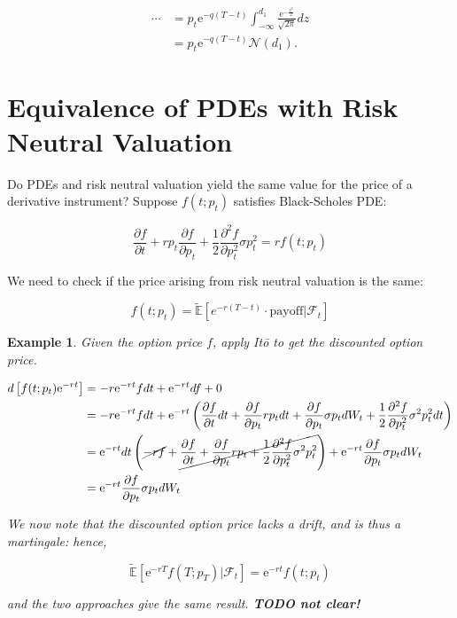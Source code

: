 \documentclass[oneside,titlepage,headinclude,12pt,a4paper,BCOR5mm,footinclude]{book}
\theoremstyle{defn}
\newtheorem{example}{Example}
\newcommand{\eexp}{\mathrm{e}}
\newcommand{\rnE}[1]{\mathbb{\tilde E}\left[ {#1} \right]}
\newcommand\de\partial
\begin{document}
\begin{align*}
  \cdots &= p_t \eexp^{-q(T-t)} \int_{-\infty}^{d_1} \frac{\eexp^{-\frac{z^2}{2}}}{\sqrt{2\pi}} dz
  \\&= p_t \eexp^{-q(T-t)} \mathcal{N}(d_1).
\end{align*}

\section{Equivalence of PDEs with Risk Neutral Valuation}

Do PDEs  and risk  neutral valuation  yield the same  value for  the price  of a
derivative instrument? Suppose $f(t;p_t)$ satisfies Black-Scholes PDE:

\[
  \frac{\de f}{\de t} + rp_t\frac{\de f}{\de p_t} + \frac{1}{2} \frac{\de^2 f}{\de p_t^2}\sigma p_t^2 = rf(t;p_t)
\]

We need to check if the price arising from risk neutral valuation is the same:

\[
  f(t;p_t) = \rnE{e^{-r(T-t)} \cdot \text{payoff} | \mathcal{F}_t}
\]

\begin{example} Given the option price $f$, apply It\=o to get the discounted option price.

\begin{align*}
  d\left[ f(t;p_t) \eexp^{-rt}\right] &= -r\eexp^{-rt} fdt + \eexp^{-rt} df + 0
  \\&= -r\eexp^{-rt} fdt + \eexp^{-rt} \left( \frac{\de f}{\de t} dt + \frac{\de f}{\de p_t} rp_tdt+ \frac{\de f}{\de p_t} \sigma p_t dW_t + 
       \frac{1}{2}\frac{\de^2 f}{\de p_t^2} \sigma^2p_t^2dt \right)
  \\&= \eexp^{-rt}dt \left( \cancel{-rf} + \cancel{\frac{\de f}{\de t} + \frac{\de f}{\de p_t} rp_t + \frac{1}{2} \frac{\de^2 f}{\de p_t^2} \sigma^2 p_t^2}\right)
       + \eexp^{-rt} \frac{\de f}{\de p_t}\sigma p_t dW_t
  \\&= \eexp^{-rt} \frac{\de f}{\de p_t}\sigma p_t dW_t
\end{align*}

We now note that the discounted option price lacks a drift, and is thus a \textit{martingale}: hence, 

\[
  \rnE{ \eexp^{-rT} f(T;p_T)| \mathcal{F}_t} = \eexp^{-rt}f(t;p_t) 
\]

and the two approaches give the same result. \textbf{TODO not clear!}

\end{example}
\end{document}
